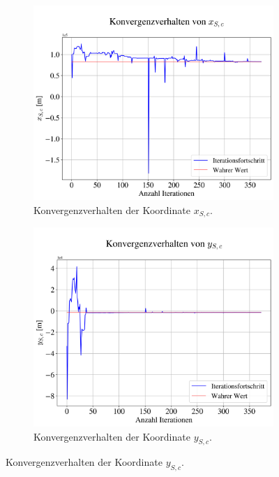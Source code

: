 \documentclass[a4paper,12pt]{article}
\numberwithin{equation}{section}
\begin{document}
\begin{figure}[ht]
	\centering
	\begin{subfigure}[t]{0.49\textwidth}
	\centering
	\includegraphics[width=\textwidth]{figures/conv_xp.png}
	\caption{Konvergenzverhalten der Koordinate $x_{S,c}$.}
	\label{fig:konvverh1xp}
	\end{subfigure}
	\hfill
	\begin{subfigure}[t]{0.49\textwidth}
	\centering
	\includegraphics[width=\textwidth]{figures/conv_yp.png}
	\caption{Konvergenzverhalten der Koordinate $y_{S,c}$.}
	\label{fig:konvverh2yp}
	\end{subfigure}
\end{figure}
\end{document}
